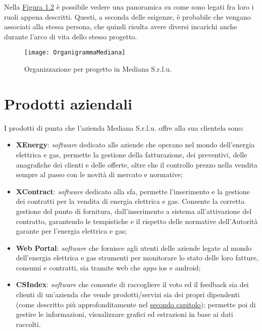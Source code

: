 Nella \hyperref[organigramma]{Figura 1.2} è possibile vedere una panoramica su come sono legati fra loro i ruoli appena descritti. Questi, a seconda delle esigenze, è probabile che vengano associati alla stessa persona, che quindi risulta avere diversi incarichi anche durante l'arco di vita dello stesso progetto.

\begin{figure}[ht]
\begin{center}
\texttt{[image: OrganigrammaMediana]}
\caption{Organizzazione per progetto in Mediana S.r.l.u.}
\label{organigramma}
\end{center}
\end{figure}
\FloatBarrier

\section{Prodotti aziendali}
\label{prodotti}

I prodotti di punta che l'azienda Mediana S.r.l.u. offre alla sua clientela sono:

\begin{itemize}
\item \textbf{XEnergy}: \textit{software} dedicato alle aziende che operano nel mondo dell'energia elettrica e gas, permette la gestione della fatturazione, dei preventivi, delle anagrafiche dei clienti e delle offerte, oltre che il controllo prezzo nella vendita sempre al passo con le novità di mercato e normative;
\item \textbf{XContract}: \textit{software} dedicato alla \acrshort{sfa}, permette l'inserimento e la gestione dei contratti per la vendita di energia elettrica e gas. Consente la corretta gestione del punto di fornitura, dall'inserimento a sistema all'attivazione del contratto, garantendo le tempistiche e il rispetto delle normative dell'Autorità garante per l'energia elettrica e gas;
\item \textbf{Web Portal}: \textit{software} che fornisce agli utenti delle aziende legate al mondo dell'energia elettrica e gas strumenti per monitorare lo stato delle loro fatture, consumi e contratti, sia tramite web che \textit{apps} \gls{ios} e \gls{android};
\item \textbf{CSIndex}: \textit{software} che consente di raccogliere il voto ed il feedback sia dei clienti di un'azienda che vende prodotti/servizi sia dei propri dipendenti (come descritto più approfonditamente nel \hyperref[cap:progetto-stage]{secondo capitolo}); permette poi di gestire le informazioni, visualizzare grafici ed estrazioni in base ai dati raccolti.
\end{itemize}

